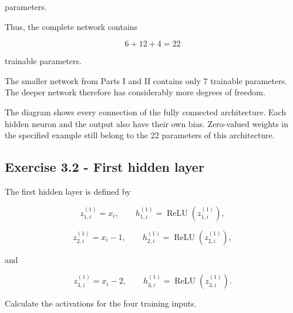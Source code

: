 \documentclass[10pt]{article}
\begin{document}
parameters.

Thus, the complete network contains

\[
6+12+4=22
\]

trainable parameters.

The smaller network from Parts I and II contains only 7 trainable parameters. The deeper network therefore has considerably more degrees of freedom.


The diagram shows every connection of the fully connected architecture. Each hidden neuron and the output also have their own bias. Zero-valued weights in the specified example still belong to the 22 parameters of this architecture.
\begin{center}
\end{center}
\par\endgroup

\subsection*{Exercise 3.2 - First hidden layer}
The first hidden layer is defined by

\[
z^{(1)}_{1,i}=x_i,
\qquad
h^{(1)}_{1,i}=\operatorname{ReLU}(z^{(1)}_{1,i}),
\]

\[
z^{(1)}_{2,i}=x_i-1,
\qquad
h^{(1)}_{2,i}=\operatorname{ReLU}(z^{(1)}_{2,i}),
\]

and

\[
z^{(1)}_{3,i}=x_i-2,
\qquad
h^{(1)}_{3,i}=\operatorname{ReLU}(z^{(1)}_{3,i}).
\]

Calculate the activations for the four training inputs.
\end{document}
